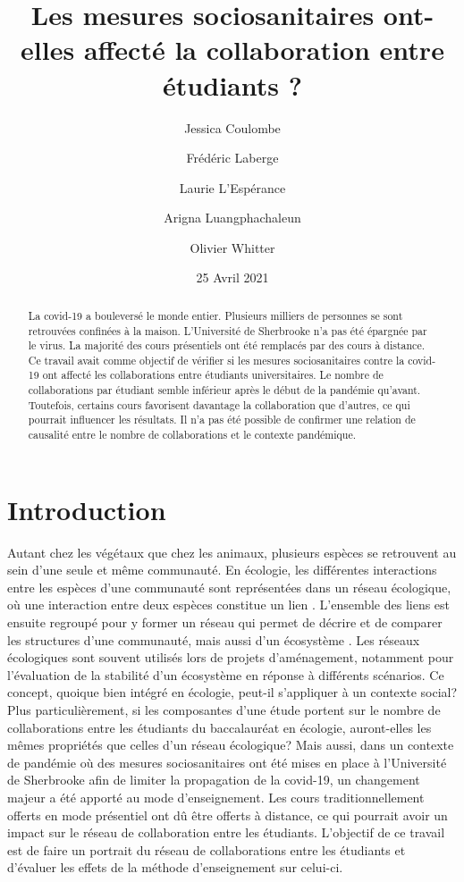 \documentclass{article}
\title{Les mesures sociosanitaires ont-elles affecté la collaboration entre étudiants ?}
\author{Jessica Coulombe \and Frédéric Laberge \and Laurie L'Espérance \and Arigna Luangphachaleun \and Olivier Whitter}
\date{25 Avril 2021}
\begin{document}
\maketitle

\begin{abstract}
    La covid-19 a bouleversé le monde entier. Plusieurs milliers de personnes se sont retrouvées confinées à la maison. L’Université de Sherbrooke n’a pas été épargnée par le virus. La majorité des cours présentiels ont été remplacés par des cours à distance. Ce travail avait comme objectif de vérifier si les mesures sociosanitaires contre la covid-19 ont affecté les collaborations entre étudiants universitaires. Le nombre de collaborations par étudiant semble inférieur après le début de la pandémie qu’avant. Toutefois, certains cours favorisent davantage la collaboration que d’autres, ce qui pourrait influencer les résultats. Il n’a pas été possible de confirmer une relation de causalité entre le nombre de collaborations et le contexte pandémique.
\end{abstract}
\section*{Introduction}
    Autant chez les végétaux que chez les animaux, plusieurs espèces se retrouvent au sein d’une seule et même communauté. En écologie, les différentes interactions entre les espèces d’une communauté sont représentées dans un réseau écologique, où une interaction entre deux espèces constitue un lien \cite{landi_complexity_2018}. L’ensemble des liens est ensuite regroupé pour y former un réseau qui permet de décrire et de comparer les structures d’une communauté, mais aussi d’un écosystème \cite{bruder_importance_2019}. Les réseaux écologiques sont souvent utilisés lors de projets d’aménagement, notamment pour l’évaluation de la stabilité d’un écosystème en réponse à différents scénarios\cite{bruder_importance_2019}. Ce concept, quoique bien intégré en écologie, peut-il s’appliquer à un contexte social? Plus particulièrement, si les composantes d’une étude portent sur le nombre de collaborations entre les étudiants du baccalauréat en écologie, auront-elles les mêmes propriétés que celles d’un réseau écologique? Mais aussi, dans un contexte de pandémie où des mesures sociosanitaires ont été mises en place à l’Université de Sherbrooke afin de limiter la propagation de la covid-19, un changement majeur a été apporté au mode d’enseignement. Les cours traditionnellement offerts en mode présentiel ont dû être offerts à distance, ce qui pourrait avoir un impact sur le réseau de collaboration entre les étudiants. L’objectif de ce travail est de faire un portrait du réseau de collaborations entre les étudiants et d’évaluer les effets de la méthode d’enseignement sur celui-ci.
\end{document}
